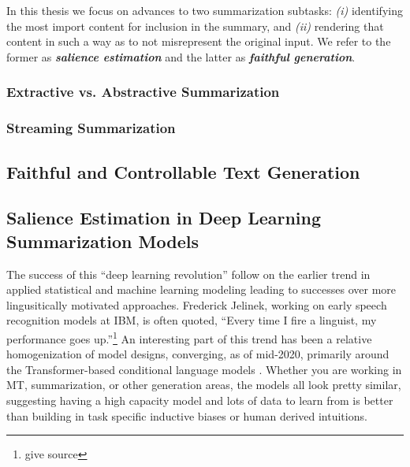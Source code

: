 ~\\~\\









In this thesis we focus on advances to two summarization subtasks:
\textit{(i)} identifying the most import content for inclusion in the summary, 
and \textit{(ii)}
rendering that content in such a way as to not misrepresent the original 
input. We refer to the former as \textbf{\textit{salience estimation}} and the latter
as \textbf{\textit{faithful generation}}. 




\subsubsection{Extractive vs. Abstractive Summarization}


\subsubsection{Streaming Summarization}

\subsection{Faithful and Controllable Text Generation}


\subsection{Salience Estimation in Deep Learning Summarization Models}

The success of this ``deep learning revolution'' follow on the earlier
trend in applied statistical and machine learning modeling leading to successes
over more lingusitically motivated approaches. Frederick Jelinek, working on 
early speech recognition models at IBM, is often quoted, 
``Every time I fire a linguist, my performance goes up.''\footnote{give source} An interesting part of this trend has been a relative homogenization 
of model designs, converging, as of mid-2020, primarily around 
the Transformer-based conditional language models \cite{bart,gpt}. Whether
you are working in MT, summarization, or other generation areas, the models
all look pretty similar, suggesting having a high capacity model and 
lots of data to learn from is better than building in task specific 
inductive biases or human derived intuitions.


